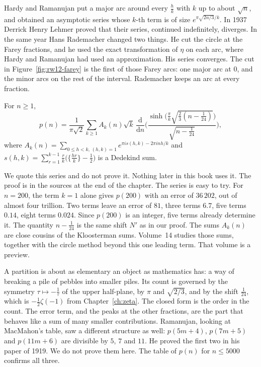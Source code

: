 Hardy and Ramanujan put a major arc around every $\frac hk$ with $k$ up to about $\sqrt n$, and obtained an asymptotic series whose $k$-th term is of size $e^{\pi\sqrt{2n/3}/k}$. In 1937 Derrick Henry Lehmer proved that their series, continued indefinitely, diverges. In the same year Hans Rademacher changed two things. He cut the circle at the Farey fractions, and he used the exact transformation of $\eta$ on each arc, where Hardy and Ramanujan had used an approximation. His series converges. The cut in Figure~\ref{fig:rw12-farey} is the first of those Farey arcs: one major arc at $0$, and the minor arcs on the rest of the interval. Rademacher keeps an arc at every fraction.

\begin{theorem}\label{thm:rademacher}
For $n\ge1$,
\[
p(n)=\frac1{\pi\sqrt2}\sum_{k\ge1}A_k(n)\sqrt k\,\frac{\mathrm d}{\mathrm dn}\Biggl(\frac{\sinh\bigl(\frac\pi k\sqrt{\frac23(n-\frac1{24})}\bigr)}{\sqrt{n-\frac1{24}}}\Biggr),
\]
where $A_k(n)=\sum_{0\le h<k,\,(h,k)=1}e^{\pi is(h,k)-2\pi inh/k}$ and $s(h,k)=\sum_{r=1}^{k-1}\frac rk\bigl(\{\frac{hr}k\}-\frac12\bigr)$ is a Dedekind sum.
\end{theorem}

We quote this series and do not prove it. Nothing later in this book uses it. The proof is in the sources at the end of the chapter. The series is easy to try. For $n=200$, the term $k=1$ alone gives $p(200)$ with an error of $36\,202$, out of almost four trillion. Two terms leave an error of $81$, three terms $6.7$, five terms $0.14$, eight terms $0.024$. Since $p(200)$ is an integer, five terms already determine it. The quantity $n-\frac1{24}$ is the same shift $N'$ as in our proof. The sums $A_k(n)$ are close cousins of the Kloosterman sums. Volume~14 studies those sums, together with the circle method beyond this one leading term. That volume is a preview.

\begin{beauty}
A partition is about as elementary an object as mathematics has: a way of breaking a pile of pebbles into smaller piles. Its count is governed by the symmetry $\tau\mapsto-\frac1\tau$ of the upper half-plane, by $\pi$ and $\sqrt{2/3}$, and by the shift $\frac1{24}$, which is $-\frac12\zeta(-1)$ from Chapter~\ref{ch:zeta}. The closed form is the order in the count. The error term, and the peaks at the other fractions, are the part that behaves like a sum of many smaller contributions. Ramanujan, looking at MacMahon's table, saw a different structure as well: $p(5m+4)$, $p(7m+5)$ and $p(11m+6)$ are divisible by $5$, $7$ and $11$. He proved the first two in his paper of 1919. We do not prove them here. The table of $p(n)$ for $n\le5000$ confirms all three.
\end{beauty}

